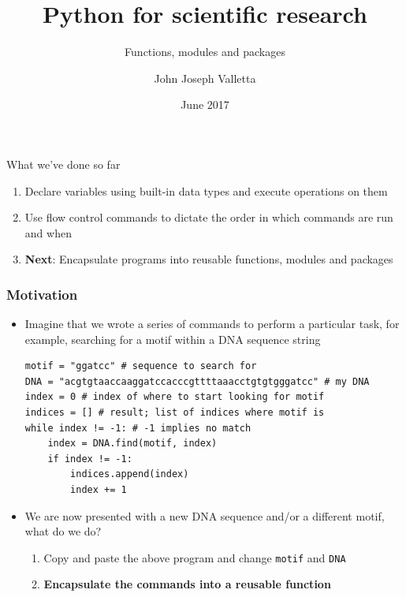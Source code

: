 \documentclass[pdf]{beamer}
\title[Python for scientific research]{Python for scientific research}
\subtitle{Functions, modules and packages}
\author{John Joseph Valletta}
\date[June 2017]{June 2017}
\institute[]{University of Exeter, Penryn Campus, UK}
\begin{document}
\begin{frame}
\titlepage
\end{frame}

\begin{frame}{What we've done so far}

	\begin{enumerate}\addtolength{\itemsep}{1\baselineskip}
		\item Declare variables using built-in data types and execute operations
		on them
		\item Use flow control commands to dictate the order in which commands are run
		and when
		\item \textbf{Next}: Encapsulate programs into reusable functions, modules and packages
	\end{enumerate}

\end{frame}

\begin{frame}[fragile]
\frametitle{Motivation}

\begin{itemize}\addtolength{\itemsep}{-1\baselineskip}
	\item<1-> Imagine that we wrote a series of commands to perform a particular task, for example,
	searching for a motif within a DNA sequence string 

\begin{lstlisting}[style=python]
motif = "ggatcc" # sequence to search for
DNA = "acgtgtaaccaaggatccacccgttttaaacctgtgtgggatcc" # my DNA
index = 0 # index of where to start looking for motif
indices = [] # result; list of indices where motif is
while index != -1: # -1 implies no match
    index = DNA.find(motif, index)
    if index != -1:
        indices.append(index)
        index += 1
\end{lstlisting}

	\item <2-> We are now presented with a new DNA sequence and/or a different motif, what do we do? 
	\begin{enumerate}\addtolength{\itemsep}{0.5\baselineskip}
		\item<2-> Copy and paste the above program and change \texttt{motif} and \texttt{DNA}
		\item<3-> \textbf{Encapsulate the commands into a reusable function}
	\end{enumerate}

\end{itemize}

\end{frame}
\end{document}
